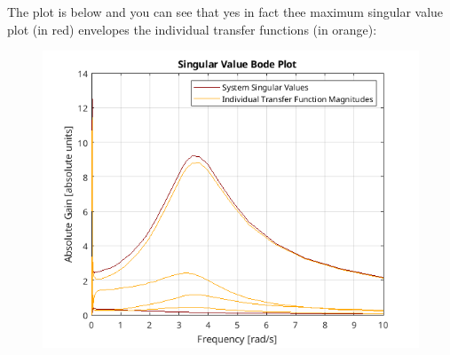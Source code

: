 \documentclass{article}
\begin{document}
The plot is below and you can see that yes in fact thee maximum singular value plot (in red) envelopes the individual transfer functions (in orange):

\begin{figure}[H]
    \centering
    \includegraphics[width=\textwidth]{singularValuePlot.png}
\end{figure}
\end{document}
